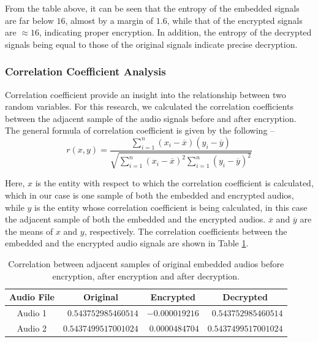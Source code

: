 \documentclass[a4paper]{cas-sc}
\begin{document}
From the table above, it can be seen that the entropy of the embedded signals are far below $16$, almost by a margin of $1.6$, while that of the encrypted signals are $\approx16$, indicating proper encryption. In addition, the entropy of the decrypted signals being equal
to those of the original signals indicate precise decryption.
\subsubsection{Correlation Coefficient Analysis}
Correlation coefficient provide an insight into the relationship between two random variables. For this research, we calculated the correlation coefficients between the adjacent sample of the audio signals before and after encryption. The general formula of correlation coefficient is given by the following --
\begin{equation}
    r(x,y)=\frac{\sum_{i=1}^{n}(x_i-\overline{x})(y_i-\overline{y})}{\sqrt{\sum_{i=1}^{n}(x_i-\overline{x})^2\sum_{i=1}^{n}(y_i-\overline{y})^2}}
\end{equation}

Here, $x$ is the entity with respect to which the correlation coefficient is calculated, which in our case is one sample of both the embedded and encrypted audios, while $y$ is the entity whose correlation coefficient is being calculated, in this case the adjacent sample of both the embedded and the encrypted audios. $\overline{x}$ and $\overline{y}$ are the means of $x$ and $y$, respectively. The correlation coefficients between the embedded and the encrypted audio signals are shown in Table \ref{table:corrcoef}.
\begin{table}[pos=h]
    \begin{center}
        \caption{Correlation between adjacent samples of original embedded audios before encryption, after encryption and after decryption.}
        \begin{tabular}{crrr}
            \hline
            \multicolumn{1}{c|}{Audio File} & \multicolumn{1}{c}{Original} & \multicolumn{1}{c}{Encrypted} & \multicolumn{1}{c}{Decrypted} \\ \hline
            \multicolumn{1}{c|}{Audio 1}    & $0.543752985460514$          & $-0.000019216$                & $0.543752985460514$           \\
            \multicolumn{1}{c|}{Audio 2}    & $0.5437499517001024$         & $0.0000484704$                & $0.5437499517001024$          \\ \hline
        \end{tabular}
        \label{table:corrcoef}
    \end{center}
\end{table}
\end{document}
